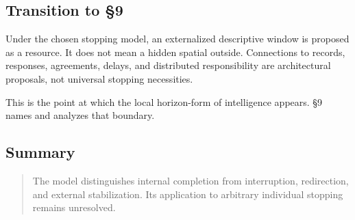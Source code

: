 \subsection{Transition to \S{}9}

Under the chosen stopping model, an externalized descriptive window is proposed as a resource. It does not mean a hidden spatial outside. Connections to records, responses, agreements, delays, and distributed responsibility are architectural proposals, not universal stopping necessities.

This is the point at which the local horizon-form of intelligence appears. \S{}9 names and analyzes that boundary.

\subsection{Summary}

\begin{quote}
The model distinguishes internal completion from interruption, redirection, and external stabilization. Its application to arbitrary individual stopping remains unresolved.
\end{quote}
